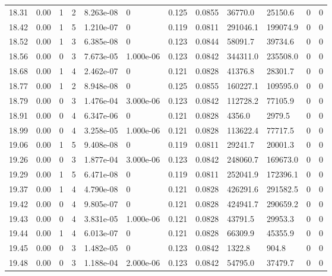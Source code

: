 \documentclass[preview]{standalone}
\begin{document}
{{{{{\begin{tabular}{L{1.2cm}C{1.2cm} C{0.3cm}C{0.5cm} C{1.4cm}C{1.4cm} C{1.4cm}C{1.4cm} C{1.6cm}C{1.6cm} C{1.6cm}C{1.6cm}}
  18.31  &  0.00  & 1     &  2 &  8.263e-08  & 0  &  0.125&   0.0855& 36770.0 & 25150.6   &  0 & 0  \\ 
  18.42  &  0.00  & 1     &  5 &  1.210e-07  & 0  &  0.119&   0.0811& 291046.1 & 199074.9   &  0 & 0  \\ 
  18.52  &  0.00  & 1     &  3 &  6.385e-08  & 0  &  0.123&   0.0844& 58091.7 & 39734.6   &  0 & 0  \\ 
  18.56  &  0.00  & 0     &  3 &  7.673e-05  & 1.000e-06  &  0.123&   0.0842& 344311.0 & 235508.0   &  0 & 0  \\ 
  18.68  &  0.00  & 1     &  4 &  2.462e-07  & 0  &  0.121&   0.0828& 41376.8 & 28301.7   &  0 & 0  \\ 
  18.77  &  0.00  & 1     &  2 &  8.948e-08  & 0  &  0.125&   0.0855& 160227.1 & 109595.0   &  0 & 0  \\ 
  18.79  &  0.00  & 0     &  3 &  1.476e-04  & 3.000e-06  &  0.123&   0.0842& 112728.2 & 77105.9   &  0 & 0  \\ 
  18.91  &  0.00  & 0     &  4 &  6.347e-06  & 0  &  0.121&   0.0828& 4356.0 & 2979.5   &  0 & 0  \\ 
  18.99  &  0.00  & 0     &  4 &  3.258e-05  & 1.000e-06  &  0.121&   0.0828& 113622.4 & 77717.5   &  0 & 0  \\ 
  19.06  &  0.00  & 1     &  5 &  9.408e-08  & 0  &  0.119&   0.0811& 29241.7 & 20001.3   &  0 & 0  \\ 
  19.26  &  0.00  & 0     &  3 &  1.877e-04  & 3.000e-06  &  0.123&   0.0842& 248060.7 & 169673.0   &  0 & 0  \\ 
  19.29  &  0.00  & 1     &  5 &  6.471e-08  & 0  &  0.119&   0.0811& 252041.9 & 172396.1   &  0 & 0  \\ 
  19.37  &  0.00  & 1     &  4 &  4.790e-08  & 0  &  0.121&   0.0828& 426291.6 & 291582.5   &  0 & 0  \\ 
  19.42  &  0.00  & 0     &  4 &  9.805e-07  & 0  &  0.121&   0.0828& 424941.7 & 290659.2   &  0 & 0  \\ 
  19.43  &  0.00  & 0     &  4 &  3.831e-05  & 1.000e-06  &  0.121&   0.0828& 43791.5 & 29953.3   &  0 & 0  \\ 
  19.44  &  0.00  & 1     &  4 &  6.013e-07  & 0  &  0.121&   0.0828& 66309.9 & 45355.9   &  0 & 0  \\ 
  19.45  &  0.00  & 0     &  3 &  1.482e-05  & 0  &  0.123&   0.0842& 1322.8 & 904.8   &  0 & 0  \\ 
  19.48  &  0.00  & 0     &  3 &  1.188e-04  & 2.000e-06  &  0.123&   0.0842& 54795.0 & 37479.7   &  0 & 0  \\ 

\end{tabular}}}}}}
\end{document}
